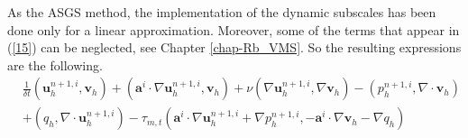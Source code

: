 As the ASGS method, the implementation of the dynamic subscales has been done only for a linear approximation. Moreover, some of the terms that appear in (\ref{15}) can be neglected, see Chapter \ref{chap-Rb_VMS}. So the resulting expressions are the following.
\begin{align}
\label{16}
&\frac{1}{\delta t}(\mathbf{u}_h^{n+1,i},\mathbf{v}_h)+(\mathbf{a}^i\cdot\nabla\mathbf{u}_h^{n+1,i},\mathbf{v}_h)+\nu(\nabla\mathbf{u}_h^{n+1,i},\nabla\mathbf{v}_h)-(p_h^{n+1,i},\nabla\cdot\mathbf{v}_h)\\\nonumber
&+(q_h,\nabla\cdot\mathbf{u}_h^{n+1,i})-\tau_{m,t}(\mathbf{a}^i\cdot\nabla\mathbf{u}_h^{n+1,i}+\nabla p_h^{n+1,i},-\mathbf{a}^i\cdot\nabla\mathbf{v}_h-\nabla q_h)\\\nonumber

\end{align}
